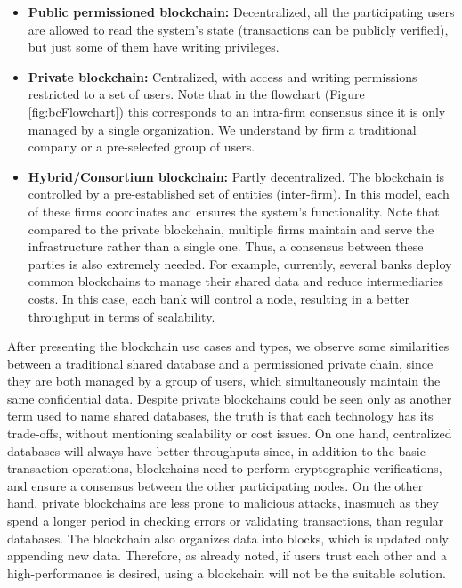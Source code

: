 \begin{itemize}
	\item \textbf{Public permissioned blockchain:} Decentralized, all the participating users are allowed to read the system's state (transactions can be publicly verified), but just some of them have writing privileges.
	\item \textbf{Private blockchain:} Centralized, with access and writing permissions restricted to a set of users. Note that in the flowchart (Figure \ref{fig:bcFlowchart}) this corresponds to an intra-firm consensus since it is only managed by a single organization. We understand by firm a traditional company or a pre-selected group of users.
	\item \textbf{Hybrid/Consortium blockchain:} Partly decentralized. The blockchain is controlled by a pre-established set of entities (inter-firm). In this model, each of these firms coordinates and ensures the system's functionality. Note that compared to the private blockchain, multiple firms maintain and serve the infrastructure rather than a single one. Thus, a consensus between these parties is also extremely needed. For example, currently, several banks deploy common blockchains to manage their shared data and reduce intermediaries costs. In this case, each bank will control a node, resulting in a better throughput in terms of scalability.
\end{itemize}

After presenting the blockchain use cases and types, we observe some similarities between a traditional shared database and a permissioned private chain, since they are both managed by a group of users, which simultaneously maintain the same confidential data. Despite private blockchains could be seen only as another term used to name shared databases, the truth is that each technology has its trade-offs, without mentioning scalability or cost issues. On one hand, centralized databases will always have better throughputs since, in addition to the basic transaction operations, blockchains need to perform cryptographic verifications, and ensure a consensus between the other participating nodes. On the other hand, private blockchains are less prone to malicious attacks, inasmuch as they spend a longer period in checking errors or validating transactions, than regular databases. The blockchain also organizes data into blocks, which is updated only appending new data. Therefore, as already noted, if users trust each other and a high-performance is desired, using a blockchain will not be the suitable solution.


